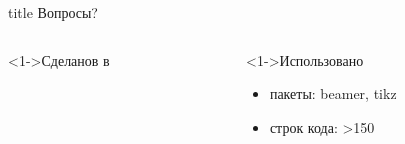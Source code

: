 \documentclass[pdf,9pt,aspectratio=169]{beamer}
\begin{document}
\begin{frame}{}
  \vfill
  \begin{beamercolorbox}[sep=8pt,center,shadow=true,rounded=true]{title}
    Вопросы?
  \end{beamercolorbox}
  \vfill
  \begin{columns}[T]
    \begin{column}[]{0.45\textwidth}  
      \begin{exampleblock}<1->{Сделанов в}
        \begin{center}
           \Huge\LaTeXe
        \end{center}
      \end{exampleblock}
    \end{column}
    \begin{column}[]{0.45\textwidth}  
      \begin{block}<1->{Использовано}
        \begin{itemize}
          \item пакеты: beamer, tikz
          \item строк кода: >150 
        \end{itemize}
      \end{block}
    \end{column}
  \end{columns}
  \vfill
\end{frame}
\end{document}
